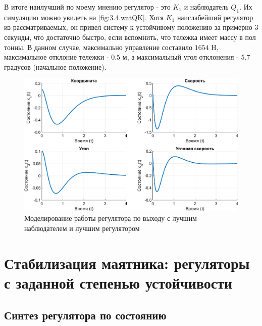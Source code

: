 В итоге наилучший по моему мнению регулятор - это $K_1$ и наблюдатель $Q_1$.
Их симуляцию можно увидеть на \autoref{fig:3.4.watQK}. Хотя $K_1$
наислабейший регулятор из рассматриваемых, он привел систему к устойчивому
положению за примерно 3 секунды, что достаточно быстро, если вспомнить, что
тележка имеет массу в пол тонны. В данном случае, максимально управление
составило $1654$ H, максимальное отклоние тележки - $0.5$ м, 
а максимальный угол отклонения - $5.7$ градусов (начальное положение).
\begin{figure}[H]
    \centering
    \includegraphics[width=0.8\linewidth]{figs/3.4.watQK.png}
    \caption{Моделирование работы регулятора по выходу 
    с лучшим наблюдателем  и лучшим регулятором}
    \label{fig:3.4.watQK}
\end{figure}

\chapter{Стабилизация маятника: регуляторы с заданной степенью устойчивости}

\section{Синтез регулятора по состоянию}

